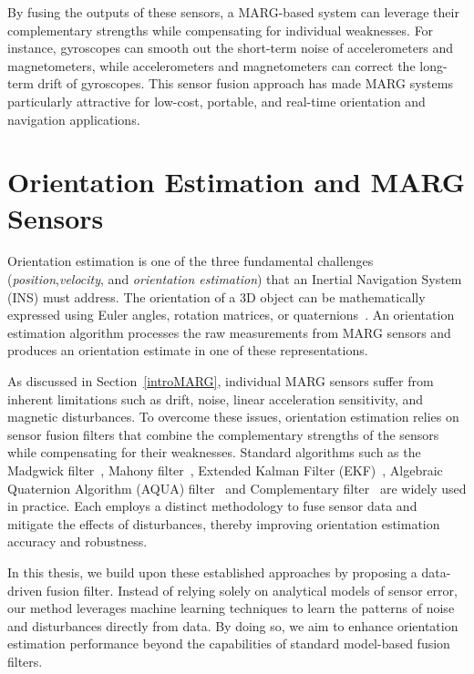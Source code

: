 \documentclass{iutbscthesis}
\begin{document}
By fusing the outputs of these sensors, a MARG-based system can leverage their complementary strengths while compensating for individual weaknesses. For instance, gyroscopes can smooth out the short-term noise of accelerometers and magnetometers, while accelerometers and magnetometers can correct the long-term drift of gyroscopes. This sensor fusion approach has made MARG systems particularly attractive for low-cost, portable, and real-time orientation and navigation applications.
 


\section{Orientation Estimation and MARG Sensors}\label{orientationMARG}
Orientation estimation is one of the three fundamental challenges (\emph{position},\emph{velocity}, and \emph{orientation estimation}) that an Inertial Navigation System (INS) must address. The orientation of a 3D object can be mathematically expressed using Euler angles, rotation matrices, or quaternions~\cite{attitudeREpresntation}. An orientation estimation algorithm processes the raw measurements from MARG sensors and produces an orientation estimate in one of these representations.  

As discussed in Section~\ref{introMARG}, individual MARG sensors suffer from inherent limitations such as drift, noise, linear acceleration sensitivity, and magnetic disturbances. To overcome these issues, orientation estimation relies on sensor fusion filters that combine the complementary strengths of the sensors while compensating for their weaknesses. Standard algorithms such as the Madgwick filter~\cite{madgwick2011estimation}, Mahony filter~\cite{mahony2008nonlinear}, Extended Kalman Filter (EKF)~\cite{EKF}, Algebraic Quaternion Algorithm (AQUA) filter~\cite{valenti2015keeping} and Complementary filter~\cite{compfilter} are widely used in practice. Each employs a distinct methodology to fuse sensor data and mitigate the effects of disturbances, thereby improving orientation estimation accuracy and robustness.   

In this thesis, we build upon these established approaches by proposing a data-driven fusion filter. Instead of relying solely on analytical models of sensor error, our method leverages machine learning techniques to learn the patterns of noise and disturbances directly from data. By doing so, we aim to enhance orientation estimation performance beyond the capabilities of standard model-based fusion filters.
\end{document}
